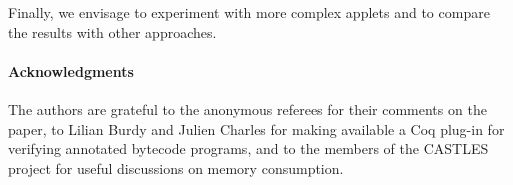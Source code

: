 Finally, we envisage to experiment with more complex applets and to
compare the results with other approaches.

\paragraph*{Acknowledgments} The authors are grateful to the anonymous
referees for their comments on the paper, to Lilian Burdy and Julien
Charles for making available a Coq plug-in for verifying annotated
bytecode programs, and to the members of the CASTLES project for
useful discussions on memory consumption.







